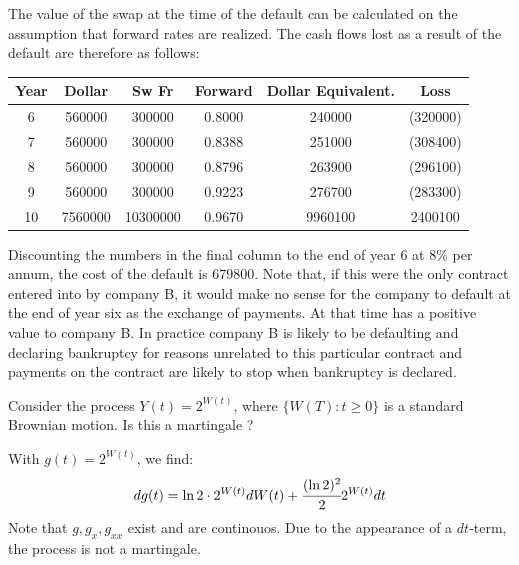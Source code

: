 \documentclass[12pt,a4paper]{exam}
\begin{document}
\begin{questions}
\begin{solution}
\begin{solution}
The value of the swap at the time of the default can be calculated on the assumption that forward rates are realized. The cash flows lost as a result of the default are therefore as follows:

\begin{center}
	\begin{tabular}{|c|c|c|c|c|c|}
Year & Dollar& Sw Fr & Forward &Dollar Equivalent. & Loss \\ \hline
6 &560000& 300000& 0.8000& 240000 & (320000) \\ \hline
7 &560000& 300000& 0.8388& 251000 & (308400) \\ \hline
8 &560000& 300000& 0.8796& 263900 & (296100) \\ \hline
9 &560000& 300000& 0.9223& 276700 & (283300) \\ \hline
10& 7560000& 10300000& 0.9670& 9960100 & 2400100 \\ \hline
	\end{tabular}
\end{center}

Discounting the numbers in the final column to the end of year 6 at 8\% per annum, the cost of the default is 679800. Note that, if this were the only contract entered into by company B, it would make no sense for the company to default at the end of year six as the exchange of payments. At that time has a positive value to company B.
In practice company B is likely to be defaulting and declaring bankruptcy for reasons unrelated to this particular contract and payments on the contract are likely to stop when bankruptcy is declared.


\question Consider the process $Y(t) = 2^{W(t)}$, where $\{W(T):t\geq 0\}$ is a standard Brownian motion. Is this a martingale ?
\fillwithlines{3cm}
\begin{solution}
With $g(t)=2^{W(t)}$, we find:
\begin{equation*}
dg(t) = \ln2\cdot 2^{W(t)}dW(t) +\cfrac{(\ln2)^2}{2}2^{W(t)}dt
\end{equation*}
Note that $g, g_{x}, g_{xx}$ exist and are continouos. 
Due to the appearance of a $dt$-term, the process is not a martingale.
\end{solution}


\end{solution}
\end{solution}
\end{questions}
\end{document}
